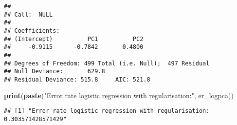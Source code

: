 \documentclass[
]{article}
\newenvironment{Shaded}{\begin{snugshade}}{\end{snugshade}}
\newcommand{\FunctionTok}[1]{\textcolor[rgb]{0.13,0.29,0.53}{\textbf{#1}}}
\newcommand{\NormalTok}[1]{#1}
\newcommand{\StringTok}[1]{\textcolor[rgb]{0.31,0.60,0.02}{#1}}
\begin{document}
\begin{verbatim}
## 
## Call:  NULL
## 
## Coefficients:
## (Intercept)          PC1          PC2  
##     -0.9115      -0.7842       0.4800  
## 
## Degrees of Freedom: 499 Total (i.e. Null);  497 Residual
## Null Deviance:       629.8 
## Residual Deviance: 515.8     AIC: 521.8
\end{verbatim}

\begin{Shaded}
\begin{Highlighting}[]
\FunctionTok{print}\NormalTok{(}\FunctionTok{paste}\NormalTok{(}\StringTok{"Error rate logistic regression with regularisation:"}\NormalTok{, er\_logpca))}
\end{Highlighting}
\end{Shaded}

\begin{verbatim}
## [1] "Error rate logistic regression with regularisation: 0.303571428571429"
\end{verbatim}
\end{document}
